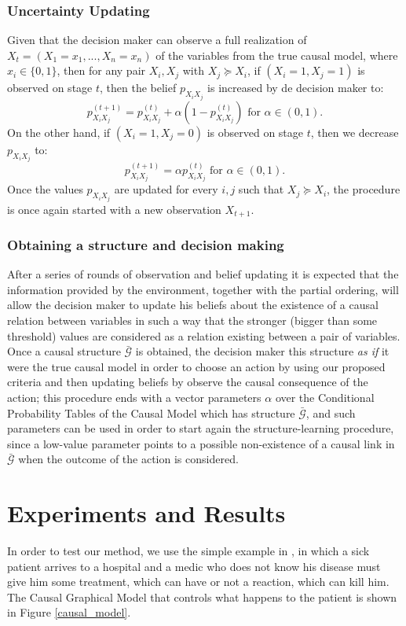 \documentclass[letterpaper]{article}
\begin{document}
\subsubsection{Uncertainty Updating}
Given that the decision maker can observe a full realization of $X_t=(X_1=x_1,...,X_n=x_n)$ of the variables from the true causal model, where $x_i \in \{0,1 \}$, then for any pair $X_i,X_j$ with $X_j \succeq X_i$, if $(X_i=1, X_j=1)$ is observed on stage $t$, then the belief $p_{X_i X_j}$ is increased by de decision maker to:
\begin{equation}
 p_{X_i X_j}^{(t+1)} = p_{X_i X_j}^{(t)}+\alpha (1-p_{X_i X_j}^{(t)}) \textrm{ for } \alpha \in (0,1). 
 \end{equation}
On the other hand, if $(X_i=1, X_j=0)$ is observed on stage $t$, then we decrease $p_{X_i X_j}$ to:
\begin{equation}
p_{X_i X_j}^{(t+1)} =   \alpha p_{X_i X_j}^{(t)}  \textrm{ for } \alpha \in (0,1).  \end{equation}
Once the values  $p_{X_i X_j}$ are updated for every $i,j$ such that $X_j \succeq X_i$, the procedure is once again started with a new observation $X_{t+1}$.

\subsubsection{Obtaining a structure and decision making}
After a series of rounds of observation and belief updating it is expected that the information provided by the environment, together with the partial ordering, will allow the decision maker to update his beliefs about the existence of a causal relation between variables in such a way that the stronger (bigger than some threshold) values are considered as a relation existing between a pair of variables. Once a causal structure $\bar{\mathcal{G}}$ is obtained, the decision maker this structure \textit{as if} it were the true causal model in order to choose an action by using our proposed criteria and then updating beliefs by observe the causal consequence of the action; this procedure ends with a vector parameters $\alpha$ over the Conditional Probability Tables of the Causal Model which has structure $\bar{\mathcal{G}}$, and such parameters can be used in order to start again the structure-learning procedure, since a low-value parameter points to a possible non-existence of a causal link in $\bar{\mathcal{G}}$ when the outcome of the action is considered.

\section{Experiments and Results}
In order to test our method, we use the simple example in \cite{gonzalez2018playing}, in which a sick patient arrives to a hospital and a medic who does not know his disease must give him some treatment, which can have or not a reaction, which can kill him. The Causal Graphical Model that controls what happens to the patient is shown in Figure \ref{causal_model}.
\end{document}
